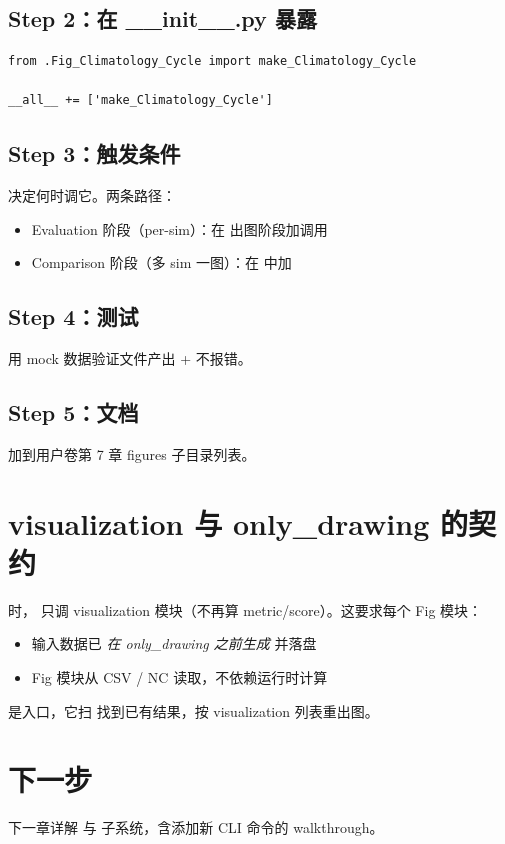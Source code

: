 \subsection{Step 2：在 __init__.py 暴露}

\begin{verbatim}
from .Fig_Climatology_Cycle import make_Climatology_Cycle

__all__ += ['make_Climatology_Cycle']
\end{verbatim}

\subsection{Step 3：触发条件}

决定何时调它。两条路径：

\begin{itemize}
  \item Evaluation 阶段（per-sim）：在  出图阶段加调用
  \item Comparison 阶段（多 sim 一图）：在  中加
\end{itemize}

\subsection{Step 4：测试}

 用 mock 数据验证文件产出 + 不报错。

\subsection{Step 5：文档}

加到用户卷第 7 章 figures 子目录列表。

\section{visualization 与 only\_drawing 的契约}

 时，\openbench{} 只调 visualization 模块（不再算 metric/score）。这要求每个 Fig 模块：

\begin{itemize}
  \item 输入数据已 \emph{在 only\_drawing 之前生成} 并落盘
  \item Fig 模块从 CSV / NC 读取，不依赖运行时计算
\end{itemize}

 是入口，它扫  找到已有结果，按 visualization 列表重出图。

\section{下一步}

下一章详解  与  子系统，含添加新 CLI 命令的 walkthrough。
